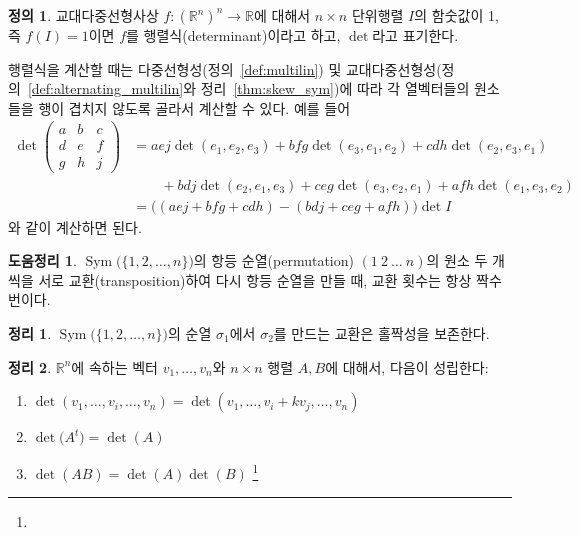 \documentclass[unfonts,oneside,a4paper]{oblivoir}
\theoremstyle{definition}
\newtheorem{definition}{정의}[section]
\theoremstyle{theorem}
\newtheorem{theorem}{정리}[section]
\theoremstyle{theorem}
\newtheorem{lemma}{도움정리}[section]
\theoremstyle{remark}
\theoremstyle{remark}
\theoremstyle{remark}
\theoremstyle{remark}
\renewcommand{\vec}[1]{\bm{\mathit{#1}}}
\DeclareMathOperator{\Sym}{Sym}
\begin{document}
\begin{definition}
    교대다중선형사상 $f: (\mathbb R^n)^n \rightarrow \mathbb R$에 대해서 $n \times n$ 단위행렬 $I$의 함숫값이 1, 즉 $f(I) = 1$이면 $f$를 행렬식(determinant)이라고 하고, $\det$라고 표기한다.
\end{definition}

행렬식을 계산할 때는 다중선형성(정의~\ref{def:multilin}) 및 교대다중선형성(정의~\ref{def:alternating_multilin}와 정리~\ref{thm:skew_sym})에 따라 각 열벡터들의 원소들을 행이 겹치지 않도록 골라서 계산할 수 있다.
예를 들어
\begin{align*}
    \det
    \begin{pmatrix}
        a & b & c\\
        d & e & f\\
        g & h & j
    \end{pmatrix}
    &= aej \det (\vec e_1, \vec e_2, \vec e_3) + bfg \det (\vec e_3, \vec e_1, \vec e_2) + cdh \det (\vec e_2, \vec e_3, \vec e_1)\\
    &\qquad+ bdj \det (\vec e_2, \vec e_1, \vec e_3) + ceg \det (\vec e_3, \vec e_2, \vec e_1) + afh \det (\vec e_1, \vec e_3, \vec e_2)\\
    &= \bigl((aej + bfg + cdh) - (bdj + ceg + afh)\bigr) \det I
\end{align*}
와 같이 계산하면 된다.

\begin{lemma}
    $\Sym\bigl(\{1, 2, \dots, n\}\bigr)$의 항등 순열(permutation) $(1\ 2\ \dots\ n)$의 원소 두 개씩을 서로 교환(transposition)하여 다시 항등 순열을 만들 때, 교환 횟수는 항상 짝수번이다.
\end{lemma}

\begin{theorem}
    $\Sym\bigl(\{1, 2, \dots, n\}\bigr)$의 순열 $\sigma_1$에서 $\sigma_2$를 만드는 교환은 홀짝성을 보존한다.
\end{theorem}

\begin{theorem} \label{thm:det_props}
    $\mathbb R^n$에 속하는 벡터 $\vec v_1, \dots, \vec v_n$와 $n \times n$ 행렬 $A, B$에 대해서, 다음이 성립한다:
    \begin{enumerate}
        \item $\det(\vec v_1, \dots, \vec v_i, \dots, \vec v_n) = \det(\vec v_1, \dots, \vec v_i + k \vec v_j, \dots, \vec v_n)$
        \item $\det\bigl(A^t\bigr) = \det(A)$
        \item $\det(AB) = \det(A) \det(B)$ \footnote{}
    \end{enumerate}
\end{theorem}
\end{document}
